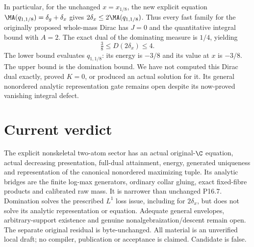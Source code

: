 In particular, for the unchanged $x=x_{1/8}$, the new explicit equation
$\MA(q_{1,1/8})=\delta_g+\delta_x$ gives
$2\delta_x\le2\MA(q_{1,1/8})$.
Thus every fast family for the originally proposed whole-mass Dirac
has $J=0$ and the quantitative integral bound with $A=2$.
The exact dual of the dominating measure is $1/4$, yielding
\[
 \tfrac38\le D(2\delta_x)\le4.
\]
The lower bound evaluates $q_{1,1/8}$: its energy is $-3/8$ and
its value at $x$ is $-3/8$. The upper bound is the domination bound.
We have not computed this Dirac dual exactly, proved $K=0$, or produced
an actual solution for it. Its general nonordered analytic representation
gate remains open despite its now-proved vanishing integral defect.

\section{Current verdict}
The explicit nonskeletal two-atom sector has an actual original-$\C$
equation, actual decreasing presentation, full-dual attainment, energy,
generated uniqueness and representation of the canonical nonordered
maximizing tuple. Its analytic bridges are the finite log-max generators,
ordinary collar gluing, exact fixed-fibre products and calibrated raw mass.
It is narrower than unchanged P16.7. Domination solves the prescribed
$L^1$ loss issue, including for $2\delta_x$, but does not solve its
analytic representation or equation. Adequate general envelopes,
arbitrary-support existence and genuine nonalgebraization/descent remain
open. The separate original residual is byte-unchanged. All material is
an unverified local draft; no compiler, publication or acceptance is claimed.
Candidate is false.
